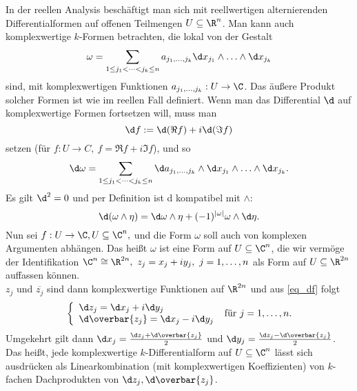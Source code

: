 		In der reellen Analysis beschäftigt man sich mit reellwertigen alternierenden Differentialformen auf offenen Teilmengen $ U \subseteq \R^n $. Man kann auch komplexwertige $k$-Formen betrachten, die lokal von der Gestalt
		\[ \omega = \sum_{1 \leq j_1 < \dots < j_k \leq n} a_{j_1,\dots,j_k} \d x_{j_1} \wedge \dotsc \wedge \d x_{j_k} \]
		sind, mit komplexwertigen Funktionen $ a_{j_1,\dots,j_k}: U \to \C $. Das äußere Produkt solcher Formen ist wie im reellen Fall definiert. Wenn man das Differential $\d$ auf komplexwertige Formen fortsetzen will, muss man 
		\begin{equation}\label{eq_df}
			\d f := \d (\Re f) + i \d (\Im f)
		\end{equation}
		 setzen (für $ f: U \to C,\ f = \Re f + i \Im f $), und so 
		\[ \d \omega = \sum_{1 \leq j_1 < \dots < j_k \leq n} \d a_{j_1,\dotsc,j_k} \wedge \d x_{j_1} \wedge \dotsc \wedge \d x_{j_k}. \]
		Es gilt $ \d^2 = 0 $ und per Definition ist d kompatibel mit $\wedge$: 
		$$ \d(\omega \wedge \eta) = \d \omega \wedge \eta + (-1)^{|\omega|} \omega\wedge \d \eta. $$
		Nun sei $ f: U \to \C, U \subseteq \C^n, $ und die Form $\omega$	soll auch von komplexen Argumenten abhängen. Das heißt $\omega$ ist eine Form auf $ U \subseteq \C^n $, die wir vermöge der Identifikation $ \C^n \cong \R^{2n},\ z_j = x_j + iy_j,\ j=1,\dotsc,n $ als Form auf $ U \subseteq \R^{2n} $ auffassen können.\\
		$ z_j $ und $ \overbar{z_j} $ sind dann komplexwertige Funktionen auf $ \R^{2n} $ und aus \ref{eq_df} folgt
		\[
		\left\{\begin{array}{ll}
			\d z_j = \d x_j + i \d y_j\\
			\d\overbar{z_j} = \d x_j - i \d y_j
		\end{array} \right.\ \text{für } j=1,\dotsc,n.
		\]
		Umgekehrt gilt dann $ \d x_j = \frac{\d z_j + \d\overbar{z_j}}{2} $ und $ \d y_j = \frac{\d z_j - \d\overbar{z_j}}{2} $.\\
		Das heißt, jede komplexwertige $k$-Differentialform auf $ U \subseteq \C^n $ lässt sich ausdrücken als Linearkombination (mit komplexwertigen Koeffizienten) von $k$-fachen Dachprodukten von $ \d z_j, \d \overbar{z_j} $.
		
